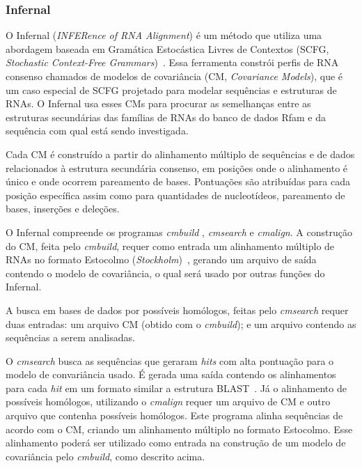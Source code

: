 
\subsubsection*{Infernal}

O Infernal (\textit{INFERence of RNA Alignment}) é um método que utiliza uma abordagem baseada em Gramática Estocástica Livres de Contextos (SCFG, \textit{Stochastic Context-Free Grammars})~\citep{eddy1994rna:1994,sakakibara1994stochastic:1994}. Essa ferramenta constrói perfis de RNA consenso chamados de modelos de covariância (CM, \textit{Covariance Models}), que é um caso especial de SCFG projetado para modelar sequências e estruturas de RNAs. O Infernal usa esses CMs para procurar as semelhanças entre as estruturas secundárias das famílias de RNAs do banco de dados Rfam e da sequência com qual está sendo investigada.


 Cada CM é construído a partir do alinhamento múltiplo de sequências e de dados relacionados à estrutura secundária consenso, em posições onde o alinhamento é único e onde ocorrem pareamento de bases. Pontuações são atribuídas para cada posição específica assim como para quantidades de nucleotídeos, pareamento de bases, inserções e deleções.


 O Infernal compreende os programas \textit{cmbuild} , \textit{cmsearch} e \textit{cmalign}. A construção do CM, feita pelo \textit{cmbuild}, requer como entrada um alinhamento múltiplo de RNAs no formato Estocolmo (\textit{Stockholm})~\citep{eddy2003infernal:2003}, gerando um arquivo de saída contendo o modelo de covariância, o qual será usado por outras funções do Infernal. 
 
 A busca em bases de dados por possíveis homólogos, feitas pelo \textit{cmsearch} requer duas entradas: um arquivo CM (obtido com o \textit{cmbuild}); e um arquivo contendo as sequências a serem analisadas.

O \textit{cmsearch} busca as sequências que geraram \textit{hits} com alta pontuação para o modelo de convariância usado. É gerada uma saída contendo os alinhamentos para cada \textit{hit} em um formato similar a estrutura BLAST~\citep{altschul1990basic:1990}. Já o alinhamento de possíveis homólogos, utilizando o \textit{cmalign} requer um arquivo de CM e outro arquivo que contenha possíveis homólogos. Este programa alinha sequências de acordo com o CM, criando um alinhamento múltiplo no formato Estocolmo. Esse alinhamento poderá ser utilizado como entrada na construção de um modelo de covariância pelo \textit{cmbuild}, como descrito acima.


